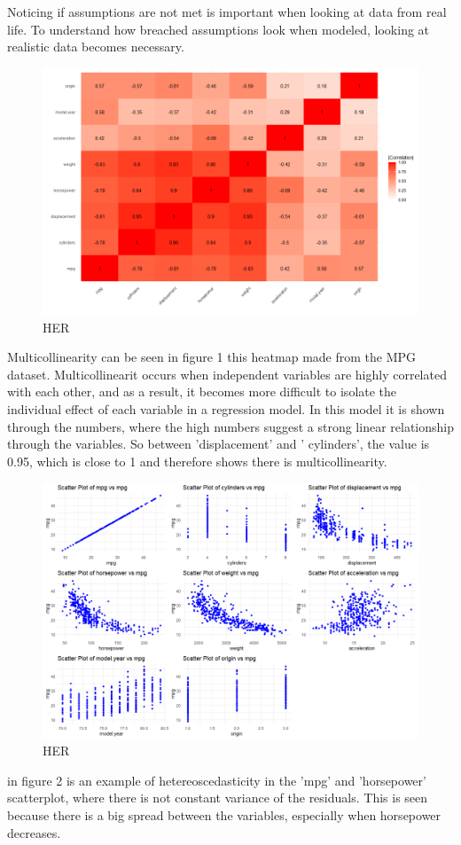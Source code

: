 Noticing if assumptions are not met is important when looking at data from real life.
To understand how breached assumptions look when modeled, looking at realistic data becomes necessary. \newline

\begin{figure}[h!]
	\centering
	\includegraphics[width=\linewidth]{billder/1.png}
	\caption{HER}
	\label{fig:HEAT}
\end{figure}
Multicollinearity can be seen in figure 1 this heatmap made from the MPG dataset. Multicollinearit occurs when independent variables are highly correlated with each other, and as a result, it becomes more difficult to isolate the individual effect of each variable in a regression model.
In this model it is shown through the numbers, where the high numbers suggest a strong linear relationship through the variables. So between 'displacement' and ' cylinders', the value is 0.95, which is close to 1 and therefore shows there is multicollinearity. \newline

\begin{figure}[h!]
	\centering
	\includegraphics[width=\linewidth]{billder/2.png}
	\caption{HER}
	\label{fig:Scatter}
\end{figure}
in figure 2 is an example of hetereoscedasticity in the 'mpg' and 'horsepower' scatterplot, where there is not constant variance of the residuals. This is seen because there is a big spread between the variables, especially when horsepower decreases.   